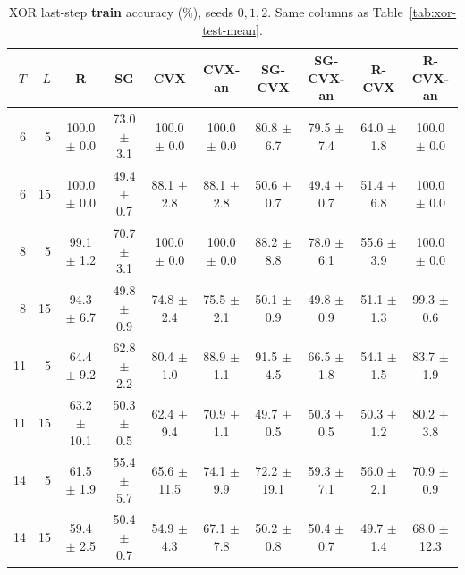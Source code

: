 \documentclass[11pt]{article}
\begin{document}
\begin{table}[t]
\centering
\caption{XOR last-step \textbf{train} accuracy (\%), seeds $0,1,2$. Same columns as Table~\ref{tab:xor-test-mean}.}
\label{tab:xor-train-mean}
\small
\begin{tabular}{rrcccccccc}
\toprule
$T$ & $L$ & R & SG & CVX & CVX-an & SG-CVX & SG-CVX-an & R-CVX & R-CVX-an \\
\midrule
6 & 5 & 100.0 $\pm$ 0.0 & 73.0 $\pm$ 3.1 & 100.0 $\pm$ 0.0 & 100.0 $\pm$ 0.0 & 80.8 $\pm$ 6.7 & 79.5 $\pm$ 7.4 & 64.0 $\pm$ 1.8 & 100.0 $\pm$ 0.0 \\
6 & 15 & 100.0 $\pm$ 0.0 & 49.4 $\pm$ 0.7 & 88.1 $\pm$ 2.8 & 88.1 $\pm$ 2.8 & 50.6 $\pm$ 0.7 & 49.4 $\pm$ 0.7 & 51.4 $\pm$ 6.8 & 100.0 $\pm$ 0.0 \\
8 & 5 & 99.1 $\pm$ 1.2 & 70.7 $\pm$ 3.1 & 100.0 $\pm$ 0.0 & 100.0 $\pm$ 0.0 & 88.2 $\pm$ 8.8 & 78.0 $\pm$ 6.1 & 55.6 $\pm$ 3.9 & 100.0 $\pm$ 0.0 \\
8 & 15 & 94.3 $\pm$ 6.7 & 49.8 $\pm$ 0.9 & 74.8 $\pm$ 2.4 & 75.5 $\pm$ 2.1 & 50.1 $\pm$ 0.9 & 49.8 $\pm$ 0.9 & 51.1 $\pm$ 1.3 & 99.3 $\pm$ 0.6 \\
11 & 5 & 64.4 $\pm$ 9.2 & 62.8 $\pm$ 2.2 & 80.4 $\pm$ 1.0 & 88.9 $\pm$ 1.1 & 91.5 $\pm$ 4.5 & 66.5 $\pm$ 1.8 & 54.1 $\pm$ 1.5 & 83.7 $\pm$ 1.9 \\
11 & 15 & 63.2 $\pm$ 10.1 & 50.3 $\pm$ 0.5 & 62.4 $\pm$ 9.4 & 70.9 $\pm$ 1.1 & 49.7 $\pm$ 0.5 & 50.3 $\pm$ 0.5 & 50.3 $\pm$ 1.2 & 80.2 $\pm$ 3.8 \\
14 & 5 & 61.5 $\pm$ 1.9 & 55.4 $\pm$ 5.7 & 65.6 $\pm$ 11.5 & 74.1 $\pm$ 9.9 & 72.2 $\pm$ 19.1 & 59.3 $\pm$ 7.1 & 56.0 $\pm$ 2.1 & 70.9 $\pm$ 0.9 \\
14 & 15 & 59.4 $\pm$ 2.5 & 50.4 $\pm$ 0.7 & 54.9 $\pm$ 4.3 & 67.1 $\pm$ 7.8 & 50.2 $\pm$ 0.8 & 50.4 $\pm$ 0.7 & 49.7 $\pm$ 1.4 & 68.0 $\pm$ 12.3 \\
\bottomrule
\end{tabular}
\end{table}
\end{document}
